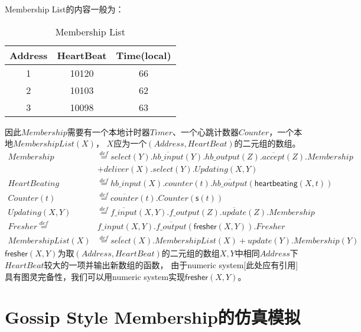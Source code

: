 Membership List的内容一般为：
\begin{table}[!hpt]
    \caption[Membership List]{Membership List\footnotemark}
    \label{tab:firstone}
    \centering
    \begin{tabular}{@{}ccc@{}} \toprule
      Address & HeartBeat & Time(local) \\ \midrule
      1 & 10120 & 66\\
      2 & 10103 & 62\\
      3 & 10098 & 63\\ \bottomrule
    \end{tabular}
  \end{table}
因此$Membership$需要有一个本地计时器$Timer$、一个心跳计数器$Counter$，一个本地$MembershipList(X)$，
$X$应为一个$(Address, HeartBeat)$的二元组的数组。
\begin{align*}
    Membership&\stackrel{def}{=}select(Y).\overline{hb\_input}(Y).hb\_output(Z).\overline{accept}(Z).Membership\\
    &+deliver(X).select(Y).Updating(X,Y)\\
    HeartBeating&\stackrel{def}{=}hb\_input(X).counter(t).\overline{hb\_output}(\mathsf{heartbeating}(X,t))\\
    Counter(t)&\stackrel{def}{=}\overline{counter}(t).Counter(\mathsf{s}(t))\\
    Updating(X,Y)&\stackrel{def}{=}\overline{f\_input}(X,Y).f\_output(Z).\overline{update}(Z).Membership\\
    Fresher\stackrel{def}{=}& f\_input(X,Y).\overline{f\_output}(\mathsf{fresher}(X,Y)).Fresher\\
    MembershipList(X)&\stackrel{def}{=}\overline{select}(X).MembershipList(X)+update(Y).Membership(Y)
\end{align*}
$\mathsf{fresher}(X,Y)$为取$(Address, HeartBeat)$的二元组的数组$X,Y$中相同$Address$下$HeartBeat$较大的一项并输出新数组的函数，
由于numeric system[此处应有引用]具有图灵完备性，我们可以用numeric system实现$\mathsf{fresher}(X,Y)$。

\section{Gossip Style Membership的仿真模拟}